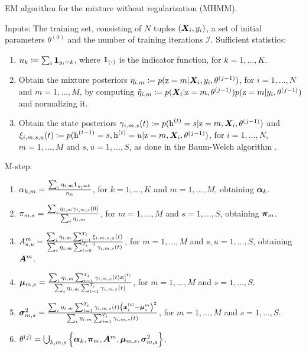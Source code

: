 \begin{algorithm}
	\caption{EM algorithm for the mixture without regularization (MHMM).}
	\label{alg:mhmm}
	\begin{algorithmic}
		\State Inputs: The training set, consisting of $N$ tuples $({\bm{X}}_i,y_i)$, a set of initial parameters $\theta^{(0)}$ and the number of training iterations $\mathcal{I}$.
		\State Sufficient statistics:
		\begin{enumerate}
			\item $n_k \coloneqq \sum_i \bm{1}_{y_i=k}$, where $\bm{1}_\mathrm{(\boldsymbol{\cdot})}$ is the indicator function, for $k=1,...,K$.
			\item Obtain the mixture posteriors $\eta_{i,m} \coloneqq p({\textnormal{z}}=m|{\bm{X}}_i, y_i,\theta^{(j-1)})$, for $i=1,...,N$ and $m=1,...,M$, by computing  $\tilde{\eta}_{i,m} \coloneqq p({\bm{X}}_i|{\textnormal{z}}=m, \theta^{(j-1)})p({\textnormal{z}}=m|y_i, \theta^{(j-1)})$ and normalizing it.
			\item Obtain the state posteriors $\gamma_{i,m,s}(t) \coloneqq p({\textnormal{h}}^{(t)}=s | {\textnormal{z}}=m, {\bm{X}}_i, \theta^{(j-1)})$ and $\xi_{i,m,s,u}(t) \coloneqq p({\textnormal{h}}^{(t-1)}=s, {\textnormal{h}}^{(t)}=u | {\textnormal{z}}=m, {\bm{X}}_i, \theta^{(j-1)})$, for $i=1,...,N$, $m=1,...,M$ and $s,u=1,...,S$, as done in the Baum-Welch algorithm \cite{Baum1972}.
		\end{enumerate}
		\State M-step:
		\begin{enumerate}
			\item ${\alpha}_{k,m} = \frac{\sum_i \eta_{i,m} \bm{1}_{y_i=k}}{n_k}$, for $k=1,...,K$ and $m=1,...,M$, obtaining ${\bm{\alpha}}_k$.
			\item ${\pi}_{m,s} = \frac{\sum_i \eta_{i,m} \gamma_{i,m,s}(0)}{\sum_i \eta_{i,m}}$, for $m=1,...,M$ and $s=1,...,S$, obtaining ${\bm{\pi}}_{m}$. 
			\item ${A}^m_{s,u} = \frac{\sum_i \eta_{i,m} \sum_{t=1}^{T_i} \xi_{i,m,s,u}(t)}{\sum_i \eta_{i,m} \sum_{t=0}^{T_i-1} \gamma_{i,m,s}(t)}$, for $m=1,...,M$ and $s,u=1,...,S$, obtaining ${\bm{A}}^m$.
			\item ${\bm{\mu}}_{m,s} = \frac{\sum_i \eta_{i,m} \sum_{t=1}^{T_i} \gamma_{i,m,s}(t) {\bm{x}}_i^{(t)}} {\sum_i \eta_{i,m} \sum_{t=1}^{T_i} \gamma_{i,m,s}(t)}$, for $m=1,...,M$ and $s=1,...,S$.
			\item ${\bm{\sigma}}^2_{m,s} = \frac{\sum_i \eta_{i,m} \sum_{t=1}^{T_i} \gamma_{i,m,s}(t) \left({\bm{x}}_i^{(t)} - \boldsymbol{\mu}^m_s\right)^2} {\sum_i \eta_{i,m} \sum_{t=1}^{T_i} \gamma_{i,m,s}(t)}$, for $m=1,...,M$ and $s=1,...,S$.
			\item $\theta^{(j)} = \bigcup_{k,m,s} \left\lbrace \boldsymbol{\alpha}_k, {\bm{\pi}}_{m}, {\bm{A}}^m, {\bm{\mu}}_{m,s}, {\bm{\sigma}}^2_{m,s} \right\rbrace$.
		\end{enumerate}
		\EndFor  
	\end{algorithmic}
\end{algorithm}

